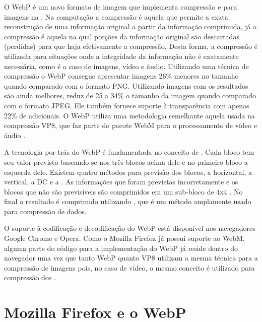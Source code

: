 \documentclass[espaco=simples,appendix=Name]{abnt}
\begin{document}
O WebP é um novo formato de imagem que implementa compressão  e  para imagens na . Na computação a compressão  é aquela que permite a exata reconstrução de uma informação original a partir da informação comprimida, já a compressão  é aquela na qual porções da informação original são descartadas (perdidas) para que haja efetivamente a compressão. Desta forma, a compressão  é utilizada para situações onde a integridade da informação não é exatamente necessária, como é o caso de imagens, vídeo e áudio. Utilizando uma técnica de compressão  o WebP consegue apresentar imagens 26\% menores no tamanho quando comparado com o formato PNG. Utilizando imagens com  os resultados são ainda melhores, reduz de 25 a 34\% o tamanho da imagem quando comparado com o formato JPEG. Ele também fornece suporte à transparência com apenas 22\% de  adicionais. O WebP utiliza uma metodologia semelhante aquela usada na compressão VP8, que faz parte do pacote WebM para o processamento de vídeo e áudio \cite{WebPLossyStudy}.

A tecnologia por trás do WebP é fundamentada no conceito de . Cada bloco tem seu valor previsto baseando-se nos três blocos acima dele e no primeiro bloco a esquerda dele. Existem quatro métodos para previsão dos blocos, a horizontal, a vertical, a DC e a . As informações que foram previstas incorretamente e os blocos que não são previsíveis são comprimidos em um sub-bloco de 4x4 . No final o resultado é comprimido utilizando , que é um método  amplamente usado para compressão de dados.

O suporte à codificação e decodificação do WebP está disponível nos navegadores Google Chrome e Opera. Como o Mozilla Firefox já possui suporte ao WebM, alguma parte do código para a implementação do WebP já reside dentro do navegador uma vez que tanto WebP quanto VP8 utilizam a mesma técnica para a compressão de imagens pois, no caso de vídeo, o mesmo conceito é utilizado para compressão dos .

\section{Mozilla Firefox e o WebP}
\end{document}
